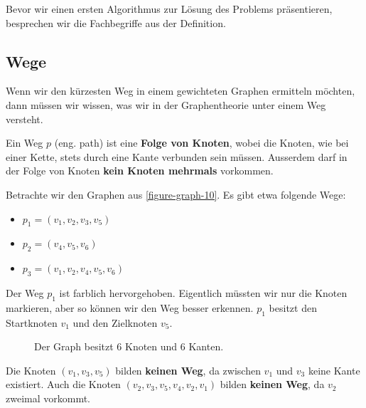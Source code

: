 Bevor wir einen ersten Algorithmus zur Lösung des Problems präsentieren, besprechen wir die Fachbegriffe aus der Definition.

\subsection{Wege}

Wenn wir den kürzesten Weg in einem gewichteten Graphen ermitteln möchten, dann müssen wir wissen, was wir in der Graphentheorie unter einem Weg versteht.

\begin{definition}[Weg]
Ein Weg $p$ (eng. path) ist eine \textbf{Folge von Knoten}, wobei die Knoten, wie bei einer Kette, stets durch eine Kante verbunden sein müssen. Ausserdem darf in der Folge von Knoten \textbf{kein Knoten mehrmals} vorkommen.
\end{definition}

\begin{example}
	Betrachte wir den Graphen aus \autoref{figure-graph-10}. Es gibt etwa folgende Wege:
	\begin{multicols}{3}
	\begin{itemize}
		\item $p_{1}=(v_1, v_2, v_3, v_5)$
		\item $p_{2}=(v_4, v_5, v_6)$
		\item $p_{3}=(v_1, v_2, v_4, v_5, v_6)$
	\end{itemize}
	\end{multicols}
	Der Weg $p_1$ ist farblich hervorgehoben. Eigentlich müssten wir nur die Knoten markieren, aber so können wir den Weg besser erkennen. $p_1$ besitzt den Startknoten $v_1$ und den Zielknoten $v_5$. 

\begin{figure}[htb]
\centering
{}
\caption{Der Graph besitzt 6 Knoten und 6 Kanten.}
\label{figure-graph-10}
\end{figure}

Die Knoten $(v_1, v_3, v_5)$ bilden \textbf{keinen Weg}, da zwischen $v_1$ und $v_3$ keine Kante existiert. Auch die Knoten $(v_2, v_3, v_5, v_4, v_2, v_1)$ bilden \textbf{keinen Weg}, da $v_2$ zweimal vorkommt.
\end{example}

